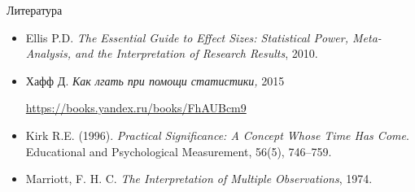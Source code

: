 \documentclass[11pt,pdf,utf8,hyperref={unicode},aspectratio=169]{beamer}
\begin{document}
\begin{frame}[allowframebreaks]{Литература}
\begin{itemize}
            \item Ellis P.D. \textit{The Essential Guide to Effect Sizes: Statistical Power, Meta-Analysis, and the Interpretation of Research Results}, 2010.

            \item Хафф Д. \textit{Как лгать при помощи статистики,} 2015 \small{\url{https://books.yandex.ru/books/FhAUBcm9}\par}


            \item Kirk R.E. (1996). \textit{Practical Significance: A Concept Whose Time Has Come}. Educational and Psychological Measurement, 56(5), 746–759.

            \item Marriott, F. H. C. \textit{The Interpretation of Multiple Observations}, 1974.
    \end{itemize}
\end{frame}
\end{document}
